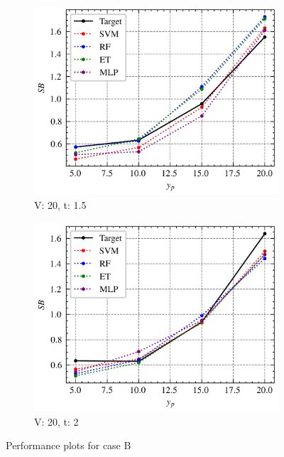 \begin{figure}[h]
    \begin{tcolorbox}[arc=0pt,boxrule=0.5pt]
        \begin{subfigure}{0.5\textwidth}
            \includegraphics[width=\textwidth]{chap5/images/performance_20_1.5}
            \caption{V: 20, t: 1.5}
            \label{fig:performance-20-1.5}
        \end{subfigure}
        \hfill
        \begin{subfigure}{0.5\textwidth}
            \includegraphics[width=\textwidth]{chap5/images/performance_20_2.0}
            \caption{V: 20, t: 2}
            \label{fig:performance-20_2.0}
        \end{subfigure}
    \end{tcolorbox}
    \caption{Performance plots for case B}
    \label{fig:performance-case-b}
\end{figure}

